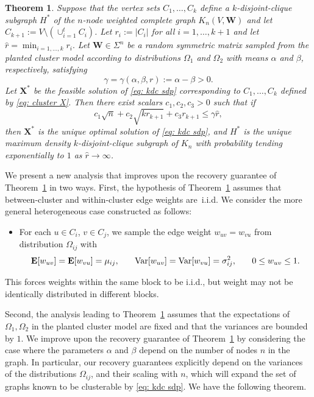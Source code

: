 \documentclass[twoside,11pt]{article}
\newtheorem{theorem}{Theorem}[section]
\newcommand{\E}{\mathbf{E}}
\newcommand{\bs}{\boldsymbol}
\newcommand{\X}{\bs {X}}
\newcommand{\W}{\bs {W}}
\newcommand{\0}{\bs{0}}
\newcommand{\rbra}[1]{\ensuremath{\left( #1 \right)}} %
\newcommand{\ra}{\rightarrow}
\newcommand{\kdc}{\(k\)-disjoint-clique }
\begin{document}
{\begin{theorem}
	\label{thm: old rec}
	Suppose that the vertex sets \(C_1, \dots, C_k\) define a \kdc subgraph \(H^*\) of the
	\(n\)-node weighted complete graph \(K_n(V, \W)\) and let \(C_{k+1} := V \setminus \rbra{ \cup^t_{i=1} C_i } \).
	Let \(r_i := |C_i|\) for all \(i=1,\dots, k+1\)
	and let \( \hat r = \min_{i=1,\dots,k} r_i.\)
	Let \( \W \in \Sigma^n\) be a random symmetric matrix sampled from the planted cluster model
	according to distributions \(\Omega_1\) and \(\Omega_2\) with means \(\alpha\) and \( \beta\), respectively,	satisfying
	\[
	\gamma = \gamma(\alpha, \beta, r):=
	\alpha - \beta > 0.
	\]
	Let \(\X^*\) be the feasible solution of \eqref{eq: kdc sdp} corresponding to \(C_1,\dots, C_k\)
	defined by \eqref{eq: cluster X}.
	Then there exist scalars \(c_1, c_2, c_3 > 0\) such that if
	\begin{equation} \label{eq: old rec}
	c_1 \sqrt{n} + c_2 \sqrt{k r_{k+1}} + c_3 r_{k+1} \le \gamma \hat r,
	\end{equation}
	then \( \X^* \) is the unique optimal solution of \eqref{eq: kdc sdp},
	and \( H^*\) is the unique maximum density \kdc subgraph of \(K_n\)
	with probability tending exponentially to \(1\) as \(\hat r \ra \infty\).
\end{theorem}
%
We present a new analysis that improves upon the recovery guarantee of Theorem~\ref{thm: old rec} in two ways.
First, the hypothesis of Theorem~\ref{thm: old rec} assumes that between-cluster and within-cluster edge weights are~i.i.d. We consider the more general heterogeneous case constructed as follows:
\begin{itemize}
	\item For each $u \in C_i$, $v \in C_j$, we sample the edge weight $w_{uv} = w_{vu}$ from distribution $\Omega_{ij}$ with
	\[
	\E[w_{uv}]  = \E[w_{vu}] = \mu_{ij}, \hspace{0.25in}
	\text{Var}[w_{uv}] = \text{Var}[w_{vu}] = \sigma^2_{ij},
	\hspace{0.25in}
	0 \le w_{uv} \le 1.
	\]
\end{itemize}
This forces weights within the same block to be i.i.d., but weight may not be identically distributed in different blocks.

Second, the analysis leading to Theorem~\ref{thm: old rec} assumes that the expectations of \(\Omega_{1}, \Omega_2\)
in the planted cluster model are fixed and that the variances are bounded by \(1\).
We improve upon the recovery guarantee of Theorem~\ref{thm: old rec} by considering the case
where the parameters \(\alpha\) and \(\beta\) depend on the number of nodes \(n\) in the graph.
In particular, our recovery guarantees explicitly depend on the
variances of the distributions \(\Omega_{ij}\), and their scaling with $n$, which will expand the set of graphs
known to be clusterable by \eqref{eq: kdc sdp}. We have the following theorem.

}
\end{document}
